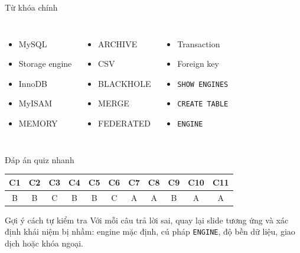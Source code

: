\documentclass[aspectratio=169,11pt]{beamer}
\newcommand{\code}[1]{\texttt{#1}}
\newcommand{\smallitem}{\setlength{\itemsep}{2pt}}
\begin{document}
\begin{frame}{Từ khóa chính}
\begin{columns}[T,onlytextwidth]
\begin{itemize}\smallitem
  \item MySQL
  \item Storage engine
  \item InnoDB
  \item MyISAM
  \item MEMORY
\end{itemize}
\begin{itemize}\smallitem
  \item ARCHIVE
  \item CSV
  \item BLACKHOLE
  \item MERGE
  \item FEDERATED
\end{itemize}
\begin{itemize}\smallitem
  \item Transaction
  \item Foreign key
  \item \code{SHOW ENGINES}
  \item \code{CREATE TABLE}
  \item \code{ENGINE}
\end{itemize}
\end{columns}
\end{frame}

\begin{frame}{Đáp án quiz nhanh}
\begin{center}
\begin{tabular}{ccccccccccc}
\toprule
\textbf{C1} & \textbf{C2} & \textbf{C3} & \textbf{C4} & \textbf{C5} & \textbf{C6} & \textbf{C7} & \textbf{C8} & \textbf{C9} & \textbf{C10} & \textbf{C11} \\
\midrule
B & B & C & B & B & C & A & A & B & A & A \\
\bottomrule
\end{tabular}
\end{center}
\vspace{0.35cm}
\begin{block}{Gợi ý cách tự kiểm tra}
Với mỗi câu trả lời sai, quay lại slide tương ứng và xác định khái niệm bị nhầm: engine mặc định, cú pháp \code{ENGINE}, độ bền dữ liệu, giao dịch hoặc khóa ngoại.
\end{block}
\end{frame}
\end{document}
